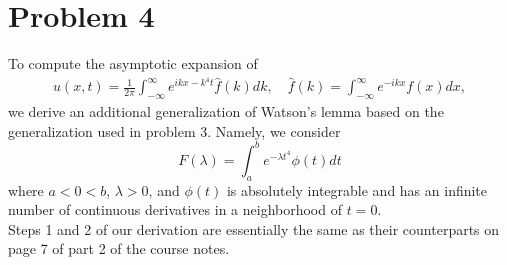 \documentclass{article}
\begin{document}
\section{Problem 4}
To compute the asymptotic expansion of
\begin{align*}
	u(x,t) = \frac{1}{2 \pi} \int_{-\infty}^\infty e^{i k x - k^4 t} \hat f(k) d k, \quad \hat f(k) = \int_{-\infty}^\infty e^{-i k x} f(x) d x,
\end{align*}
we derive an additional generalization of Watson's lemma based on the generalization used in problem 3. Namely, we consider 
\[
F(\lambda)=\int_a^b e^{-\lambda t^4}\phi(t)dt
\]
where $a<0<b$, $\lambda>0$, and $\phi(t)$ is absolutely integrable and has an infinite number of continuous derivatives in a neighborhood of $t=0$.\\
Steps 1 and 2 of our derivation are essentially the same as their counterparts on page 7 of part 2 of the course notes. 	
	
\end{document}
